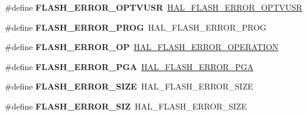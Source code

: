 \begin{DoxyCompactItemize}
\item 
\hypertarget{group___h_a_l___f_l_a_s_h___aliased___defines_ga6bcc50c3baf4770eab5bb4bb6c8ca505}{\#define {\bfseries F\-L\-A\-S\-H\-\_\-\-E\-R\-R\-O\-R\-\_\-\-O\-P\-T\-V\-U\-S\-R}~\hyperlink{group___f_l_a_s_h___error___codes_ga066064877301300d84cd3b694251143b}{H\-A\-L\-\_\-\-F\-L\-A\-S\-H\-\_\-\-E\-R\-R\-O\-R\-\_\-\-O\-P\-T\-V\-U\-S\-R}}\label{group___h_a_l___f_l_a_s_h___aliased___defines_ga6bcc50c3baf4770eab5bb4bb6c8ca505}

\item 
\hypertarget{group___h_a_l___f_l_a_s_h___aliased___defines_ga737128e267cde11757448a999b907a7c}{\#define {\bfseries F\-L\-A\-S\-H\-\_\-\-E\-R\-R\-O\-R\-\_\-\-P\-R\-O\-G}~H\-A\-L\-\_\-\-F\-L\-A\-S\-H\-\_\-\-E\-R\-R\-O\-R\-\_\-\-P\-R\-O\-G}\label{group___h_a_l___f_l_a_s_h___aliased___defines_ga737128e267cde11757448a999b907a7c}

\item 
\hypertarget{group___h_a_l___f_l_a_s_h___aliased___defines_ga7e6bf51847569d433bdb694bdb5ac0f7}{\#define {\bfseries F\-L\-A\-S\-H\-\_\-\-E\-R\-R\-O\-R\-\_\-\-O\-P}~\hyperlink{group___f_l_a_s_h___error___codes_gafa1433e0ca2366478928c04244310d44}{H\-A\-L\-\_\-\-F\-L\-A\-S\-H\-\_\-\-E\-R\-R\-O\-R\-\_\-\-O\-P\-E\-R\-A\-T\-I\-O\-N}}\label{group___h_a_l___f_l_a_s_h___aliased___defines_ga7e6bf51847569d433bdb694bdb5ac0f7}

\item 
\hypertarget{group___h_a_l___f_l_a_s_h___aliased___defines_ga3e610cf7bc499ea0e7eee1380a04f42d}{\#define {\bfseries F\-L\-A\-S\-H\-\_\-\-E\-R\-R\-O\-R\-\_\-\-P\-G\-A}~\hyperlink{group___f_l_a_s_h___error___codes_gad9f62b6567543610f667bce580550662}{H\-A\-L\-\_\-\-F\-L\-A\-S\-H\-\_\-\-E\-R\-R\-O\-R\-\_\-\-P\-G\-A}}\label{group___h_a_l___f_l_a_s_h___aliased___defines_ga3e610cf7bc499ea0e7eee1380a04f42d}

\item 
\hypertarget{group___h_a_l___f_l_a_s_h___aliased___defines_gac056ad0617d3beaf8cf2ffb0c87b7266}{\#define {\bfseries F\-L\-A\-S\-H\-\_\-\-E\-R\-R\-O\-R\-\_\-\-S\-I\-Z\-E}~H\-A\-L\-\_\-\-F\-L\-A\-S\-H\-\_\-\-E\-R\-R\-O\-R\-\_\-\-S\-I\-Z\-E}\label{group___h_a_l___f_l_a_s_h___aliased___defines_gac056ad0617d3beaf8cf2ffb0c87b7266}

\item 
\hypertarget{group___h_a_l___f_l_a_s_h___aliased___defines_gaaa959c347779d59952fcb60d15dbe2b0}{\#define {\bfseries F\-L\-A\-S\-H\-\_\-\-E\-R\-R\-O\-R\-\_\-\-S\-I\-Z}~H\-A\-L\-\_\-\-F\-L\-A\-S\-H\-\_\-\-E\-R\-R\-O\-R\-\_\-\-S\-I\-Z\-E}\label{group___h_a_l___f_l_a_s_h___aliased___defines_gaaa959c347779d59952fcb60d15dbe2b0}


\end{DoxyCompactItemize}
